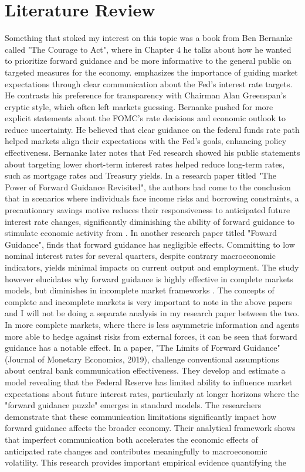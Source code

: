 \documentclass[12pt,english]{article}
\begin{document}
\section{Literature Review}\label{sec:litreview}
Something that stoked my interest on this topic was a book from Ben Bernanke called "The Courage to Act", where in Chapter 4 he talks about how he wanted to prioritize forward guidance and be more informative to the general public on targeted measures for the economy. \citet{Bernanke2015} emphasizes the importance of guiding market expectations through clear communication about the Fed’s interest rate targets. He contrasts his preference for transparency with Chairman Alan Greenspan’s cryptic style, which often left markets guessing. Bernanke pushed for more explicit statements about the FOMC’s rate decisions and economic outlook to reduce uncertainty. He believed that clear guidance on the federal funds rate path helped markets align their expectations with the Fed’s goals, enhancing policy effectiveness. Bernanke later notes that Fed research showed his public statements about targeting lower short-term interest rates helped reduce long-term rates, such as mortgage rates and Treasury yields. In a research paper titled "The Power of Forward Guidance Revisited", the authors had come to the conclusion that in scenarios where individuals face income risks and borrowing constraints, a precautionary savings motive reduces their responsiveness to anticipated future interest rate changes, significantly diminishing the ability of forward guidance to stimulate economic activity from \cite{mckay2016power}. In another research paper titled "Foward Guidance", \cite{HAGEDORN20191} finds that forward guidance has negligible effects. Committing to low nominal interest rates for several quarters, despite contrary macroeconomic indicators, yields minimal impacts on current output and employment. The study however elucidates why forward guidance is highly effective in complete markets models, but diminishes in incomplete market frameworks \cite{HAGEDORN20191}. The concepts of complete and incomplete markets is very important to note in the above papers and I will not be doing a separate analysis in my research paper between the two. In more complete markets, where there is less asymmetric information and agents more able to hedge against risks from external forces, it can be seen that forward guidance has a notable effect. In a paper, "The Limits of Forward Guidance" (Journal of Monetary Economics, 2019), \cite{CAMPBELL2019118} challenge conventional assumptions about central bank communication effectiveness. They develop and estimate a model revealing that the Federal Reserve has limited ability to influence market expectations about future interest rates, particularly at longer horizons where the "forward guidance puzzle" emerges in standard models. The researchers demonstrate that these communication limitations significantly impact how forward guidance affects the broader economy. Their analytical framework shows that imperfect communication both accelerates the economic effects of anticipated rate changes and contributes meaningfully to macroeconomic volatility. This research provides important empirical evidence quantifying the 
\end{document}
